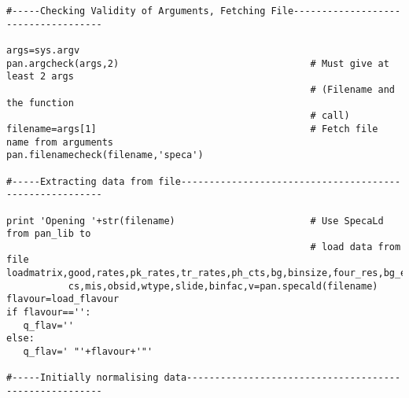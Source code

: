 \begin{verbatim}
#-----Checking Validity of Arguments, Fetching File------------------------------------

args=sys.argv
pan.argcheck(args,2)                                  # Must give at least 2 args
                                                      # (Filename and the function
                                                      # call)
filename=args[1]                                      # Fetch file name from arguments
pan.filenamecheck(filename,'speca')

#-----Extracting data from file--------------------------------------------------------

print 'Opening '+str(filename)                        # Use SpecaLd from pan_lib to
                                                      # load data from file
loadmatrix,good,rates,pk_rates,tr_rates,ph_cts,bg,binsize,four_res,bg_est,load_flavour,
           cs,mis,obsid,wtype,slide,binfac,v=pan.specald(filename)
flavour=load_flavour
if flavour=='':
   q_flav=''
else:
   q_flav=' "'+flavour+'"'

#-----Initially normalising data-------------------------------------------------------


\end{verbatim}
